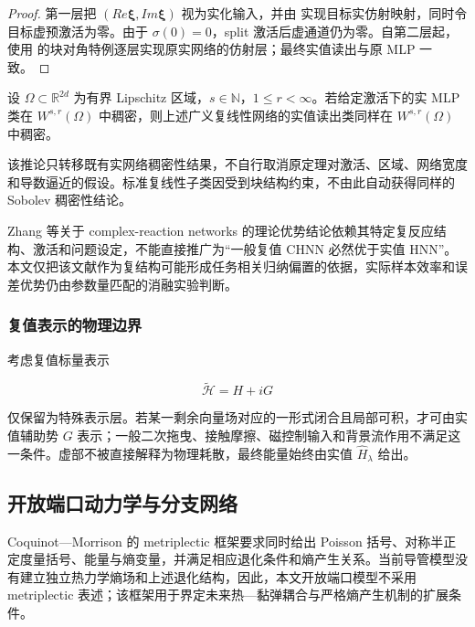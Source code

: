 \begin{proof} 第一层把 \(\left( Re\bm{\xi},Im\bm{\xi} \right)\) 视为实化输入，并由 实现目标实仿射映射，同时令目标虚预激活为零。由于 \(\sigma(0) = 0\)，split 激活后虚通道仍为零。自第二层起，使用 的块对角特例逐层实现原实网络的仿射层；最终实值读出与原 MLP 一致。\end{proof}

\begin{corollary}\label{cor:sobolev-inheritance}
设 \(\Omega \subset \mathbb{R}^{2d}\) 为有界 Lipschitz 区域，\(s \in \mathbb{N}\)，\(1 \leq r < \infty\)。若给定激活下的实 MLP 类在 \(W^{s,r}(\Omega)\) 中稠密，则上述广义复线性网络的实值读出类同样在 \(W^{s,r}(\Omega)\) 中稠密。
\end{corollary}

该推论只转移既有实网络稠密性结果，不自行取消原定理对激活、区域、网络宽度和导数逼近的假设\cite{Hornik1990DerivativeApproximation}。标准复线性子类因受到块结构约束，不由此自动获得同样的 Sobolev 稠密性结论。

Zhang 等关于 complex-reaction networks 的理论优势结论依赖其特定复反应结构、激活和问题设定\cite{Zhang2022ComplexReaction}，不能直接推广为``一般复值 CHNN 必然优于实值 HNN''。本文仅把该文献作为复结构可能形成任务相关归纳偏置的依据，实际样本效率和误差优势仍由参数量匹配的消融实验判断。

\subsubsection{复值表示的物理边界}\label{sec:chnn-4-2-5}

考虑复值标量表示

\begin{equation}
\label{eq:chnn-4-16}
\widetilde{\mathcal{H}} = H + iG
\end{equation}

仅保留为特殊表示层。若某一剩余向量场对应的一形式闭合且局部可积，才可由实值辅助势 \(G\) 表示；一般二次拖曳、接触摩擦、磁控制输入和背景流作用不满足这一条件。虚部不被直接解释为物理耗散，最终能量始终由实值 \({\widehat{H}}_{\lambda}\) 给出。

\subsection{开放端口动力学与分支网络}\label{sec:chnn-4-3}

Coquinot---Morrison 的 metriplectic 框架要求同时给出 Poisson 括号、对称半正定度量括号、能量与熵变量，并满足相应退化条件和熵产生关系\cite{Coquinot2020Metriplectic}。当前导管模型没有建立独立热力学熵场和上述退化结构，因此，本文开放端口模型不采用 metriplectic 表述；该框架用于界定未来热---黏弹耦合与严格熵产生机制的扩展条件。

